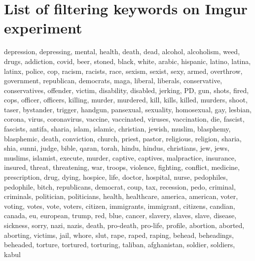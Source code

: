 \section{List of filtering keywords on Imgur experiment}
\label{appendix:ImgurFilterList}
depression, depressing, mental, health, death, dead, alcohol, alcoholism, weed, drugs, addiction, covid, beer, stoned, black, white, arabic, hispanic, latino, latina, latinx, police, cop, racism, racists, race, sexism, sexist, sexy, armed, overthrow, government, republican, democrats, maga, liberal, liberals, conservative, conservatives, offender, victim, disability, disabled, jerking, PD, gun, shots, fired, cops, officer, officers, killing, murder, murdered, kill, kills, killed, murders, shoot, taser, bystander, trigger, handgun, pansexual, sexuality, homosexual, gay, lesbian, corona, virus, coronavirus, vaccine, vaccinated, viruses, vaccination, die, fascist, fascists, antifa, sharia, islam, islamic, christian, jewish, muslim, blasphemy, blasphemic, death, conviction, church, priest, pastor, religious, religion, sharia, shia, sunni, judge, bible, qaran, torah, hindu, hindus, christians, jew, jews, muslims, islamist, execute, murder, captive, captives, malpractice, insurance, insured, threat, threatening, war, troops, violence, fighting, conflict, medicine, prescription, drug, dying, hospice, life, doctor, hospital, nurse, pedophiles, pedophile, bitch, republicans, democrat, coup, tax, recession, pedo, criminal, criminals, politician, politicians, health, healthcare, america, american, voter, voting, votes, vote, voters, citizen, immigrants, immigrant, citizens, candian, canada, eu, european, trump, red, blue, cancer, slavery, slaves, slave, disease, sickness, sorry, nazi, nazis, death, pro-death, pro-life, profile, abortion, aborted, aborting, victims, jail, whore, slut, rape, raped, raping, behead, beheadings, beheaded, torture, tortured, torturing, taliban, afghanistan, soldier, soldiers, kabul
